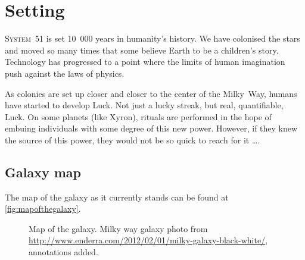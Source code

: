 







\listofproposals

\chapter{Setting}
\label{cha:history}


\textsc{System~51} is set 10~000 years in humanity's history. We have colonised
the stars and moved so many times that some believe Earth to be a children's
story. Technology has progressed to a point where the limits of human
imagination push against the laws of physics.

As colonies are set up closer and closer to the center of the
Milky~Way, humans have started to develop Luck. Not just a lucky streak, but
real, quantifiable, Luck. On some planets (like Xyron), rituals are performed in
the hope of embuing individuals with some degree of this new power. However, if
they knew the source of this power, they would not be so quick to reach for it
\ldots{}.


\section{Galaxy map}
\label{sec:galaxy-map}

The map of the galaxy as it currently stands can be found at \autoref{fig:mapofthegalaxy}.

\begin{figure*}
  \centering
  \caption{Map of the galaxy. Milky way galaxy photo from
    \url{http://www.enderra.com/2012/02/01/milky-galaxy-black-white/},
    annotations added.}
  \label{fig:mapofthegalaxy}
\end{figure*}

